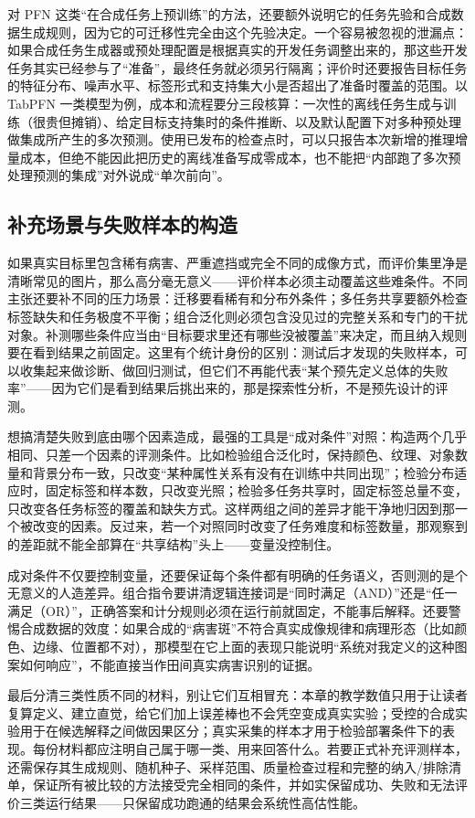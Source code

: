 对 PFN 这类“在合成任务上预训练”的方法，还要额外说明它的任务先验和合成数据生成规则，因为它的可迁移性完全由这个先验决定。一个容易被忽视的泄漏点：如果合成任务生成器或预处理配置是根据真实的开发任务调整出来的，那这些开发任务其实已经参与了“准备”，最终任务就必须另行隔离；评价时还要报告目标任务的特征分布、噪声水平、标签形式和支持集大小是否超出了准备时覆盖的范围。以 TabPFN 一类模型为例，成本和流程要分三段核算：一次性的离线任务生成与训练（很贵但摊销）、给定目标支持集时的条件推断、以及默认配置下对多种预处理做集成所产生的多次预测。使用已发布的检查点时，可以只报告本次新增的推理增量成本，但绝不能因此把历史的离线准备写成零成本，也不能把“内部跑了多次预处理预测的集成”对外说成“单次前向”。

\subsection{补充场景与失败样本的构造}
\label{sec:ket-evaluation-stress}

如果真实目标里包含稀有病害、严重遮挡或完全不同的成像方式，而评价集里净是清晰常见的图片，那么高分毫无意义——评价样本必须主动覆盖这些难条件。不同主张还要补不同的压力场景：迁移要看稀有和分布外条件；多任务共享要额外检查标签缺失和任务极度不平衡；组合泛化则必须包含没见过的完整关系和专门的干扰对象。补测哪些条件应当由“目标要求里还有哪些没被覆盖”来决定，而且纳入规则要在看到结果之前固定。这里有个统计身份的区别：测试后才发现的失败样本，可以收集起来做诊断、做回归测试，但它们不再能代表“某个预先定义总体的失败率”——因为它们是看到结果后挑出来的，那是探索性分析，不是预先设计的评测。

想搞清楚失败到底由哪个因素造成，最强的工具是“成对条件”对照：构造两个几乎相同、只差一个因素的评测条件。比如检验组合泛化时，保持颜色、纹理、对象数量和背景分布一致，只改变“某种属性关系有没有在训练中共同出现”；检验分布适应时，固定标签和样本数，只改变光照；检验多任务共享时，固定标签总量不变，只改变各任务标签的覆盖和缺失方式。这样两组之间的差异才能干净地归因到那一个被改变的因素。反过来，若一个对照同时改变了任务难度和标签数量，那观察到的差距就不能全部算在“共享结构”头上——变量没控制住。

成对条件不仅要控制变量，还要保证每个条件都有明确的任务语义，否则测的是个无意义的人造差异。组合指令要讲清逻辑连接词是“同时满足（AND）”还是“任一满足（OR）”，正确答案和计分规则必须在运行前就固定，不能事后解释。还要警惕合成数据的效度：如果合成的“病害斑”不符合真实成像规律和病理形态（比如颜色、边缘、位置都不对），那模型在它上面的表现只能说明“系统对我定义的这种图案如何响应”，不能直接当作田间真实病害识别的证据。

最后分清三类性质不同的材料，别让它们互相冒充：本章的教学数值只用于让读者复算定义、建立直觉，给它们加上误差棒也不会凭空变成真实实验；受控的合成实验用于在候选解释之间做因果区分；真实采集的样本才用于检验部署条件下的表现。每份材料都应注明自己属于哪一类、用来回答什么。若要正式补充评测样本，还需保存其生成规则、随机种子、采样范围、质量检查过程和完整的纳入/排除清单，保证所有被比较的方法接受完全相同的条件，并如实保留成功、失败和无法评价三类运行结果——只保留成功跑通的结果会系统性高估性能。

